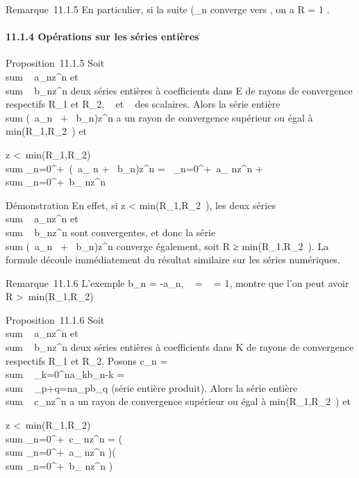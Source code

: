 \documentclass[]{article}
\begin{document}
Remarque~11.1.5 En particulier, si la suite
(\rootn\of\a_n\)
converge vers \ell, on a R = 1 \over \ell .

\paragraph{11.1.4 Opérations sur les séries entières}

Proposition~11.1.5 Soit
\\sum ~
a_nz^n et
\\sum ~
b_nz^n deux séries entières à coefficients dans E de
rayons de convergence respectifs R_1 et R_2, \alpha~ et \beta~
des scalaires. Alors la série entière
\\sum  (\alpha~a_n~ +
\beta~b_n)z^n a un rayon de convergence supérieur ou égal
à min(R_1,R_2~) et

z \textless{}\
min(R_1,R_2) \rigtharrow~\\sum
_n=0^+\infty~(\alpha~a_ n + \beta~b_n)z^n =
\alpha~\sum _n=0^+\infty~a_
nz^n + \beta~\\sum
_n=0^+\infty~b_ nz^n

Démonstration En effet, si z
\textless{} min(R_1,R_2~),
les deux séries \\sum ~
a_nz^n et
\\sum ~
b_nz^n sont convergentes, et donc la série
\\sum  (\alpha~a_n~ +
\beta~b_n)z^n converge également, soit R
≥ min(R_1,R_2~). La formule
découle immédiatement du résultat similaire sur les séries numériques.

Remarque~11.1.6 L'exemple b_n = -a_n, \alpha~ = \beta~ = 1,
montre que l'on peut avoir R \textgreater{}\
min(R_1,R_2)

Proposition~11.1.6 Soit
\\sum ~
a_nz^n et
\\sum ~
b_nz^n deux séries entières à coefficients dans K de
rayons de convergence respectifs R_1 et R_2. Posons
c_n = \\sum ~
_k=0^na_kb_n-k
= \\sum ~
_p+q=na_pb_q (série entière produit). Alors la
série entière \\sum ~
c_nz^n a un rayon de convergence supérieur ou égal à
min(R_1,R_2~) et

z \textless{}\
min(R_1,R_2) \rigtharrow~\\sum
_n=0^+\infty~c_ nz^n =
\left (\\sum
_n=0^+\infty~a_ nz^n\right
)\left (\\sum
_n=0^+\infty~b_ nz^n\right
)
\end{document}
